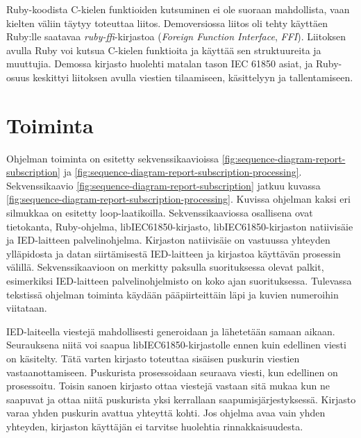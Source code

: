Ruby-koodista C-kielen funktioiden kutsuminen ei ole suoraan mahdollista, vaan kielten väliin täytyy toteuttaa liitos. Demoversiossa liitos oli tehty käyttäen Ruby:lle saatavaa \emph{ruby-ffi}-kirjastoa \cite{ruby-ffi-repo} (\emph{Foreign Function Interface}, \emph{FFI}). Liitoksen avulla Ruby voi kutsua C-kielen funktioita ja käyttää sen struktuureita ja muuttujia. Demossa kirjasto huolehti matalan tason IEC 61850 asiat, ja Ruby-osuus keskittyi liitoksen avulla viestien tilaamiseen, käsittelyyn ja tallentamiseen.


\section{Toiminta}
\label{ch:ongelmakohdat-ja-analysointi}
Ohjelman toiminta on esitetty sekvenssikaavioissa \ref{fig:sequence-diagram-report-subscription} ja \ref{fig:sequence-diagram-report-subscription-processing}. Sekvenssikaavio \ref{fig:sequence-diagram-report-subscription} jatkuu kuvassa \ref{fig:sequence-diagram-report-subscription-processing}. Kuvissa ohjelman kaksi eri silmukkaa on esitetty loop-laatikoilla. Sekvenssikaaviossa osallisena ovat tietokanta, Ruby-ohjelma, libIEC61850-kirjasto, libIEC61850-kirjaston natiivisäie ja IED-laitteen palvelinohjelma. Kirjaston natiivisäie on vastuussa yhteyden ylläpidosta ja datan siirtämisestä IED-laitteen ja kirjastoa käyttävän prosessin välillä. Sekvenssikaavioon on merkitty paksulla suorituksessa olevat palkit, esimerkiksi IED-laitteen palvelinohjelmisto on koko ajan suorituksessa. Tulevassa tekstissä ohjelman toiminta käydään pääpiirteittäin läpi ja kuvien numeroihin viitataan.

IED-laiteella viestejä mahdollisesti generoidaan ja lähetetään samaan aikaan. Seurauksena niitä voi saapua libIEC61850-kirjastolle ennen kuin edellinen viesti on käsitelty. Tätä varten kirjasto toteuttaa sisäisen puskurin viestien vastaanottamiseen. Puskurista prosessoidaan seuraava viesti, kun edellinen on prosessoitu. Toisin sanoen kirjasto ottaa viestejä vastaan sitä mukaa kun ne saapuvat ja ottaa niitä puskurista yksi kerrallaan saapumisjärjestyksessä. Kirjasto varaa yhden puskurin avattua yhteyttä kohti. Jos ohjelma avaa vain yhden yhteyden, kirjaston käyttäjän ei tarvitse huolehtia rinnakkaisuudesta. \cite{libIEC61850-repo}

